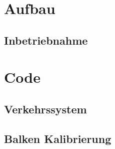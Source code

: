%

\section{Aufbau}\label{sec:assembly}
\subsection{Inbetriebnahme}\label{sec:commissioning}
\section{Code}\label{sec:code}
\subsection{Verkehrssystem}\label{subsec:traffic-system}
\subsection{Balken Kalibrierung}\label{subsec:beam-calibration}
